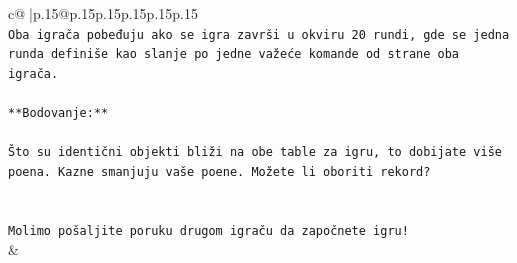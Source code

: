 \documentclass{article}
\begin{document}
{\begin{supertabular}{c@{$\;$}|p{.15\linewidth}@{}p{.15\linewidth}p{.15\linewidth}p{.15\linewidth}p{.15\linewidth}p{.15\linewidth}}
{{{\\ 
\texttt{Oba igrača pobeđuju ako se igra završi u okviru 20 rundi, gde se jedna runda definiše kao slanje po jedne važeće komande od strane oba igrača.} \\
\\ 
\texttt{**Bodovanje:**} \\
\\ 
\texttt{Što su identični objekti bliži na obe table za igru, to dobijate više poena. Kazne smanjuju vaše poene. Možete li oboriti rekord?} \\
\\ 
\\ 
\texttt{Molimo pošaljite poruku drugom igraču da započnete igru!} \\
            }
        }
    }
    & \\ \\


\end{supertabular}}
\end{document}
